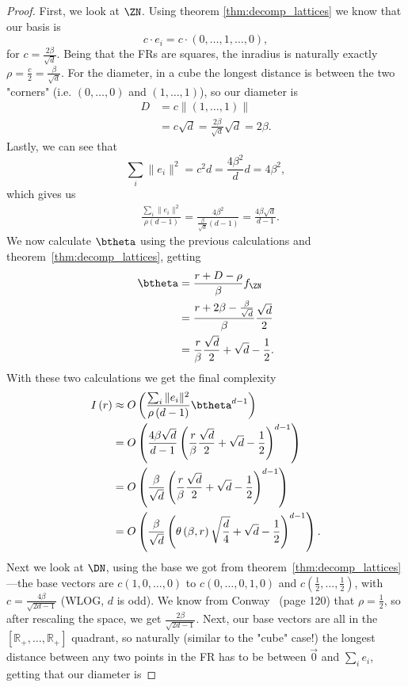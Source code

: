\begin{proof}
    First, we look at $\ZN$. Using theorem \ref{thm:decomp_lattices} we know that our basis is 
    \[
        c\cdot e_i=c\cdot\left(0,\dots,1,\dots,0\right),
    \]
    for $c=\frac{2\beta}{\sqrt{d}}$. Being that the FRs are squares, the inradius is naturally exactly $\rho=\frac{c}{2}=\frac{\beta}{\sqrt{d}}$. 
    For the diameter, in a cube the longest distance is between the two "corners" (i.e. $(0,\dots,0)$ and $(1,\dots,1)$), so our diameter is
    \begin{align*}
        D&=c\|\left(1,\dots,1\right)\|\\
        &=c\sqrt{d}=\frac{2\beta}{\sqrt{d}}\sqrt{d}=2\beta.
    \end{align*}
    Lastly, we can see that 
    \[
        \sum_i \|e_i\|^2 =c^2d=\frac{4\beta^2}{d}d=4\beta^2,
    \]
    which gives us
    \begin{align*}
        &\frac{\sum_i\|e_i\|^2}{\rho\left(d-1\right)}=
        \frac{4\beta^2}{\frac{\beta}{\sqrt{d}}\left(d-1\right)}=\frac{4\beta\sqrt{d}}{d-1}.
    \end{align*}
    We now calculate $\btheta$ using the previous calculations and theorem~\ref{thm:decomp_lattices}, getting
    \begin{align*}
        \btheta &= \frac{r+D-\rho}{\beta}f_{\ZN}\\
        &= \frac{r+2\beta - \frac{\beta}{\sqrt{d}}}{\beta}\frac{\sqrt{d}}{2}\\
        & = \frac{r}{\beta}\frac{\sqrt{d}}{2}+\sqrt{d}-\frac{1}{2}.
    \end{align*}
    With these two calculations we get the final complexity
    \begin{align*}
        I\left(r\right)&\approx O\left(\frac{\sum_i\|e_i\|^2}{\rho\left(d-1\right)}\btheta^{d-1}\right)\\
        &=O\left(\frac{4\beta\sqrt{d}}{d-1}\left(\frac{r}{\beta}\frac{\sqrt{d}}{2}+\sqrt{d}-\frac{1}{2}\right)^{d-1}\right)\\
        &=O\left(\frac{\beta}{\sqrt{d}}\left(\frac{r}{\beta}\frac{\sqrt{d}}{2}+\sqrt{d}-\frac{1}{2}\right)^{d-1}\right)\\
        &=O\left(\frac{\beta}{\sqrt{d}}\left(\theta\left(\beta,r\right)\sqrt{\frac{d}{4}}+\sqrt{d}-\frac{1}{2}\right)^{d-1}\right).
    \end{align*}
    Next we look at $\DN$, using the base we got from theorem~\ref{thm:decomp_lattices}---the base vectors are $c\left(1,0,\dots,0\right)$ to $c\left(0,\dots,0,1,0\right)$ and $c\left(\frac{1}{2},\dots,\frac{1}{2}\right)$, with $c=\frac{4\beta}{\sqrt{2d-1}}$ (WLOG, $d$ is odd). We know from Conway~\cite{conway2013sphere} (page 120) that $\rho=\frac{1}{2}$, so after rescaling the space, we get $\frac{2\beta}{\sqrt{2d-1}}$. Next, our base vectors are all in the $[\mathbb{R}_+,\dots,\mathbb{R}_+]$ quadrant, so naturally (similar to the "cube" case!) the longest distance between any two points in the FR has to be between $\overset{\rightarrow}{0}$ and $\sum_i e_i$, getting that our diameter is

\end{proof}
